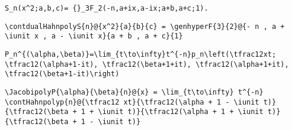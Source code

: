 \newsavebox\CUT
\begin{lrbox}{\CUT}
 \begin{minipage}[t]{0.82\textwidth}
  \lstinline[language={[latex]TeX},mathescape,breaklines=true]"S_n(x^2;a,b,c)= {}_3F_2(-n,a+ix,a-ix;a+b,a+c;1)."
 \end{minipage}
\end{lrbox}
\newsavebox\CUST
\begin{lrbox}{\CUST}
 \begin{minipage}[t]{0.82\textwidth}
  \lstinline[language={[latex]TeX},mathescape,breaklines=true]"\contdualHahnpolyS{n}@{x^2}{a}{b}{c} = \genhyperF{3}{2}@{- n , a + \iunit x , a - \iunit x}{a + b , a + c}{1}"
 \end{minipage}
\end{lrbox}
\newsavebox\CUMM
\begin{lrbox}{\CUMM}
 \begin{minipage}[t]{0.82\textwidth}
  \lstinline[language={[latex]TeX},mathescape,breaklines=true]""
 \end{minipage}
\end{lrbox}
\newsavebox\CUMA
\begin{lrbox}{\CUMA}
 \begin{minipage}[t]{0.82\textwidth}
  \lstinline[language={[latex]TeX},mathescape,breaklines=true]""
 \end{minipage}
\end{lrbox}
\newsavebox\CVT
\begin{lrbox}{\CVT}
 \begin{minipage}[t]{0.82\textwidth}
  \lstinline[language={[latex]TeX},mathescape,breaklines=true]"P_n^{(\alpha,\beta)}=\lim_{t\to\infty}t^{-n}p_n\left(\tfrac12xt; \tfrac12(\alpha+1-it), \tfrac12(\beta+1+it), \tfrac12(\alpha+1+it), \tfrac12(\beta+1-it)\right)"
 \end{minipage}
\end{lrbox}
\newsavebox\CVST
\begin{lrbox}{\CVST}
 \begin{minipage}[t]{0.82\textwidth}
  \lstinline[language={[latex]TeX},mathescape,breaklines=true]"\JacobipolyP{\alpha}{\beta}{n}@{x} = \lim_{t\to\infty} t^{-n} \contHahnpolyp{n}@{\tfrac12 xt}{\tfrac12(\alpha + 1 - \iunit t)}{\tfrac12(\beta + 1 + \iunit t)}{\tfrac12(\alpha + 1 + \iunit t)}{\tfrac12(\beta + 1 - \iunit t)}"
 \end{minipage}
\end{lrbox}
